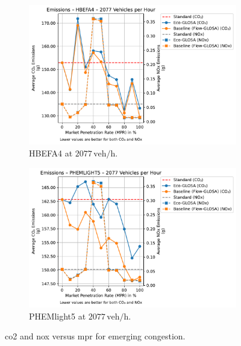 \begin{figure}[htb]
  \centering
  \begin{subfigure}[b]{0.45\textwidth}
    \includegraphics[width=\textwidth]{data/img/Emissions/Emissions_HBEFA4_Cars2077.pdf}
    \caption{HBEFA4 at $2077\,\mathrm{veh/h}$.}
    \label{fig:Emis_2077_HBEFA4}
  \end{subfigure}\hfill
  \begin{subfigure}[b]{0.45\textwidth}
    \includegraphics[width=\textwidth]{data/img/Emissions/Emissions_PHEMLIGHT5_Cars2077.pdf}
    \caption{PHEMlight5 at $2077\,\mathrm{veh/h}$.}
    \label{fig:Emis_2077_PHEM}
  \end{subfigure}
  \caption{\ac{co2} and \ac{nox} versus \ac{mpr} for emerging congestion.}
  \label{fig:Emis_2077}
\end{figure}

